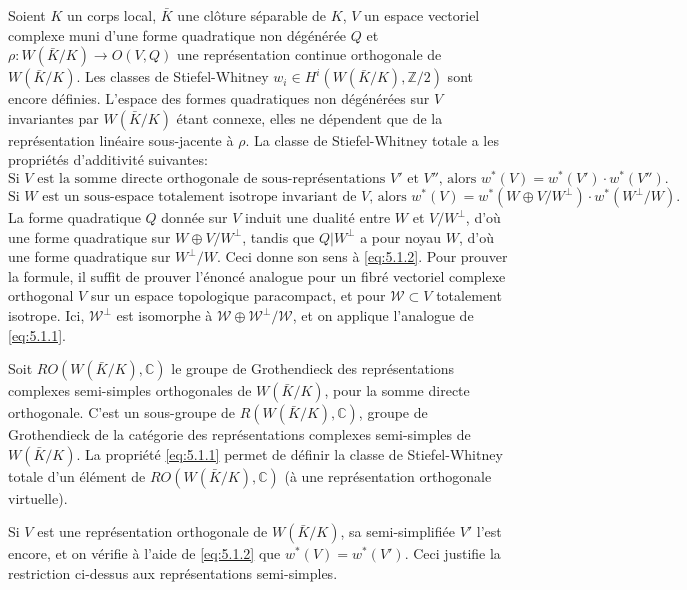 \documentclass[11pt]{amsart}
\theoremstyle{plain}
\theoremstyle{definition}
\newcommand{\C}{\mathbb{C}}
\newcommand{\Z}{\mathbb{Z}}
\begin{document}
Soient $K$ un corps local, $\bar K$ une cl\^oture s\'eparable de $K$, $V$ un espace vectoriel complexe muni d'une forme quadratique non d\'eg\'en\'er\'ee $Q$ et $\rho\colon W(\bar K/K)\to O(V,Q)$ une repr\'esentation continue orthogonale de $W(\bar K/K)$. Les classes de Stiefel-Whitney $w_i\in H^i(W(\bar K/K),\Z/2)$ sont encore d\'efinies. L'espace des formes quadratiques non d\'eg\'en\'er\'ees sur $V$ invariantes par $W(\bar K/K)$ \'etant connexe, elles ne d\'ependent que de la repr\'esentation lin\'eaire sous-jacente \`a $\rho$. La classe de Stiefel-Whitney totale a les propri\'et\'es d'additivit\'e suivantes:
\begin{equation}\label{eq:5.1.1}
\text{Si $V$ est la somme directe orthogonale de sous-repr\'esentations $V'$ et $V''$, alors }w^*(V)=w^*(V')\cdot w^*(V'').
\end{equation}
\begin{equation}\label{eq:5.1.2}
\text{Si $W$ est un sous-espace totalement isotrope invariant de $V$, alors }w^*(V)=w^*(W\oplus V/W^\perp)\cdot w^*(W^\perp/W).
\end{equation}
La forme quadratique $Q$ donn\'ee sur $V$ induit une dualit\'e entre $W$ et $V/W^\perp$, d'o\`u une forme quadratique sur $W\oplus V/W^\perp$, tandis que $Q|W^\perp$ a pour noyau $W$, d'o\`u une forme quadratique sur $W^\perp/W$. Ceci donne son sens \`a \eqref{eq:5.1.2}. Pour prouver la formule, il suffit de prouver l'\'enonc\'e analogue pour un fibr\'e vectoriel complexe orthogonal $V$ sur un espace topologique paracompact, et pour $\mathscr{W}\subset V$ totalement isotrope. Ici, $\mathscr{W}^\perp$ est isomorphe \`a $\mathscr{W}\oplus\mathscr{W}^\perp/\mathscr{W}$, et on applique l'analogue de \eqref{eq:5.1.1}.

Soit $RO(W(\bar K/K),\C)$ le groupe de Grothendieck des repr\'esentations complexes semi-simples orthogonales de $W(\bar K/K)$, pour la somme directe orthogonale. C'est un sous-groupe de $R(W(\bar K/K),\C)$, groupe de Grothendieck de la cat\'egorie des repr\'esentations complexes semi-simples de $W(\bar K/K)$. La propri\'et\'e \eqref{eq:5.1.1} permet de d\'efinir la classe de Stiefel-Whitney totale d'un \'el\'ement de $RO(W(\bar K/K),\C)$ (\`a une repr\'esentation orthogonale virtuelle).

Si $V$ est une repr\'esentation orthogonale de $W(\bar K/K)$, sa semi-simplifi\'ee $V'$ l'est encore, et on v\'erifie \`a l'aide de \eqref{eq:5.1.2} que $w^*(V)=w^*(V')$. Ceci justifie la restriction ci-dessus aux repr\'esentations semi-simples.
\end{document}
